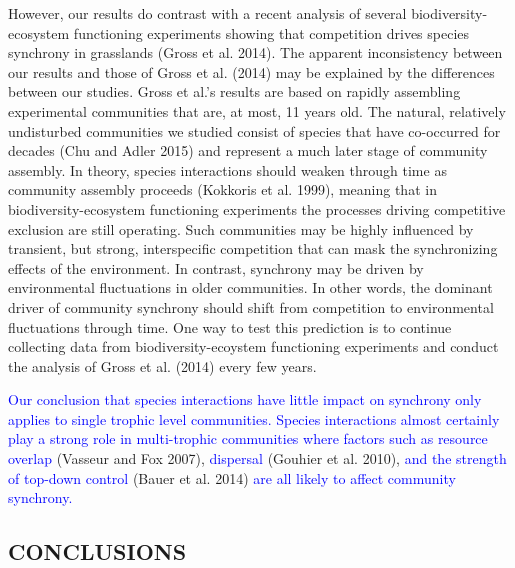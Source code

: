 \documentclass[12pt,]{article}
\begin{document}
However, our results do contrast with a recent analysis of several
biodiversity-ecosystem functioning experiments showing that competition
drives species synchrony in grasslands (Gross et al. 2014). The apparent
inconsistency between our results and those of Gross et al. (2014) may
be explained by the differences between our studies. Gross et al.'s
results are based on rapidly assembling experimental communities that
are, at most, 11 years old. The natural, relatively undisturbed
communities we studied consist of species that have co-occurred for
decades (Chu and Adler 2015) and represent a much later stage of
community assembly. In theory, species interactions should weaken
through time as community assembly proceeds (Kokkoris et al. 1999),
meaning that in biodiversity-ecosystem functioning experiments the
processes driving competitive exclusion are still operating. Such
communities may be highly influenced by transient, but strong,
interspecific competition that can mask the synchronizing effects of the
environment. In contrast, synchrony may be driven by environmental
fluctuations in older communities. In other words, the dominant driver
of community synchrony should shift from competition to environmental
fluctuations through time. One way to test this prediction is to
continue collecting data from biodiversity-ecoystem functioning
experiments and conduct the analysis of Gross et al. (2014) every few
years.

\textcolor{blue}{Our conclusion that species interactions have little impact on synchrony only applies to single trophic level communities.
Species interactions almost certainly play a strong role in multi-trophic communities where factors such as resource overlap}
(Vasseur and Fox 2007), \textcolor{blue}{dispersal} (Gouhier et al.
2010), \textcolor{blue}{and the strength of top-down control} (Bauer et
al. 2014)
\textcolor{blue}{are all likely to affect community synchrony.}

\subsection{CONCLUSIONS}\label{conclusions}
\end{document}
